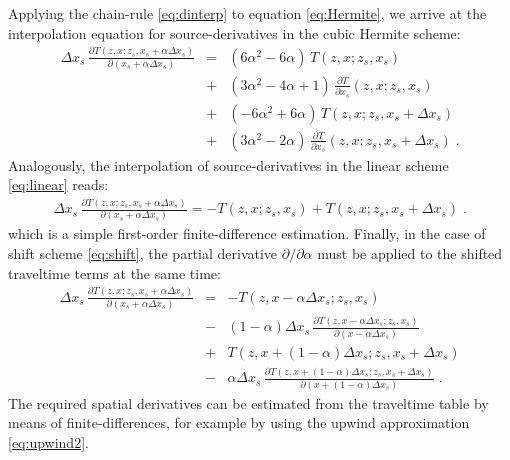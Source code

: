 Applying the chain-rule \ref{eq:dinterp} to equation \ref{eq:Hermite}, we arrive at the interpolation 
equation for source-derivatives in the cubic Hermite scheme:
\begin{equation}
\label{eq:hdinterp}
\begin{array}{lcl}
\Delta x_s\,
\frac{\partial T (z,x; z_s,x_s + \alpha \Delta x_s)}{\partial (x_s + \alpha \Delta x_s)} 
& = & (6\alpha^2-6\alpha)\,T (z,x; z_s,x_s) \\
& + & (3\alpha^2-4\alpha+1)\,\frac{\partial T}{\partial x_s} (z,x; z_s,x_s) \\
& + & (-6\alpha^2+6\alpha)\,T (z,x; z_s,x_s + \Delta x_s) \\
& + & (3\alpha^2-2\alpha)\,\frac{\partial T}{\partial x_s} (z,x; z_s,x_s + \Delta x_s)\;.
\end{array}
\end{equation}
Analogously, the interpolation of source-derivatives in the linear scheme \ref{eq:linear} reads:
\begin{equation}
\label{eq:ldinterp}
\begin{array}{lcl}
\Delta x_s\,
\frac{\partial T (z,x; z_s,x_s + \alpha \Delta x_s)}
{\partial (x_s + \alpha \Delta x_s)} = 
-T (z,x; z_s,x_s) + T (z,x; z_s,x_s + \Delta x_s)\;.
\end{array}
\end{equation}
which is a simple first-order finite-difference estimation. Finally, in the case of shift scheme 
\ref{eq:shift}, the partial derivative $\partial / \partial \alpha$ must be applied to the shifted 
traveltime terms at the same time: 
\begin{equation}
\label{eq:sdinterp}
\begin{array}{lcl}
\Delta x_s\,
\frac{\partial T (z,x; z_s,x_s + \alpha \Delta x_s)}
{\partial (x_s + \alpha \Delta x_s)} 
& = & -T (z,x- \alpha \Delta x_s; z_s,x_s) \\
& - & (1-\alpha) \Delta x_s\,
\frac{\partial T (z,x-\alpha \Delta x_s; z_s,x_s)}{\partial (x-\alpha \Delta x_s)} \\
& + & T (z,x + (1-\alpha) \Delta x_s; z_s,x_s + \Delta x_s) \\
& - & \alpha \Delta x_s\,
\frac{\partial T (z,x+(1-\alpha) \Delta x_s; z_s,x_s+\Delta x_s)}
{\partial (x+(1-\alpha) \Delta x_s)}\;.
\end{array}
\end{equation}
The required spatial derivatives can be estimated from the traveltime table by means of 
finite-differences, for example by using the upwind approximation \ref{eq:upwind2}.



